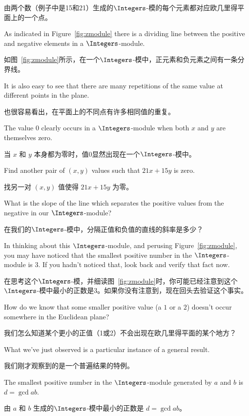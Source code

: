 由两个数（例子中是15和21）生成的$\Integers$-模的每个元素都对应欧几里得平面上的一个点。

As indicated in
Figure~\ref{fig:zmodule} there is a dividing line between the positive
and negative elements in a $\Integers$-module.

如图~\ref{fig:zmodule}所示，在一个$\Integers$-模中，正元素和负元素之间有一条分界线。

It is also easy to see
that there are many repetitions of the same value at different points
in the plane.

也很容易看出，在平面上的不同点有许多相同值的重复。

\begin{exer}
      The value $0$ clearly occurs in a $\Integers$-module when both
      $x$ and $y$ are themselves zero.

      当 $x$ 和 $y$ 本身都为零时，值0显然出现在一个$\Integers$-模中。

      Find another pair of $(x,y)$
      values such that $21x+15y$ is zero.

      找另一对 $(x,y)$ 值使得 $21x+15y$ 为零。

      What is the slope of
      the line which separates the positive values from the negative
      in our $\Integers$-module?

      在我们的$\Integers$-模中，分隔正值和负值的直线的斜率是多少？
\end{exer}

In thinking about this $\Integers$-module, and perusing
Figure~\ref{fig:zmodule}, you may have noticed that the smallest
positive number in the $\Integers$-module is 3.  If you hadn't
noticed that, look back and verify that fact now.

在思考这个$\Integers$-模，并细读图~\ref{fig:zmodule}时，你可能已经注意到这个$\Integers$-模中最小的正数是3。如果你没有注意到，现在回头去验证这个事实。

\begin{exer}
      How do we know that some smaller positive value (a $1$ or a $2$) doesn't
      occur somewhere in the Euclidean plane?

      我们怎么知道某个更小的正值（1或2）不会出现在欧几里得平面的某个地方？
\end{exer}

What we've just observed is a particular instance of a general result.

我们刚才观察到的是一个普遍结果的特例。

\begin{thm} \label{gcduniqueexists}
      The smallest positive number in the $\Integers$-module generated by
      $a$ and $b$ is $d = \gcd{a}{b}$.

      由 $a$ 和 $b$ 生成的$\Integers$-模中最小的正数是 $d = \gcd{a}{b}$。
\end{thm}

